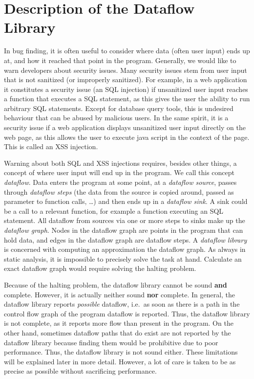 \section{Description of the Dataflow Library}
In bug finding, it is often useful to consider where data (often user input)
ends up at, and how it reached that point in the program.
Generally, we would like to warn developers about security issues.
Many security issues stem from user input that is not sanitized (or improperly sanitized).
For example, in a web application it constitutes a security issue (an SQL injection)
if unsanitized user input reaches a function that executes a SQL statement, 
as this gives the user 
the ability to run arbitrary SQL statements.
Except for database query tools, this is undesired behaviour that can be abused
by malicious users.
In the same spirit, it is a security issue if a web application displays
unsanitized user input directly on the web page, as this allows the user to execute
java script in the context of the page. This is called an XSS injection.

Warning about both SQL and XSS injections requires, besides other things,
a concept of where user input will end up in the program.
We call this concept \emph{dataflow}.
Data enters the program at some point, at a \emph{dataflow source}, passes through 
\emph{dataflow steps} (the data from the source is copied around, passed as parameter 
to function calls, \ldots) and then ends up in a \emph{dataflow sink}.
A sink could be a call to a relevant function, for example a function
executing an SQL statement.
All dataflow from sources via one or more steps to sinks make up the 
\emph{dataflow graph}.
Nodes in the dataflow graph are points in the program that can hold data, 
and edges in the dataflow graph are dataflow steps.
A \emph{dataflow library} is concerned with computing an approximation 
the dataflow graph.
As always in static analysis, it is impossible to precisely solve the task at hand.
Calculate an exact dataflow graph would require solving the halting problem.

Because of the halting problem, the dataflow library cannot be sound \textbf{and}
complete. However, it is actually neither sound \textbf{nor} complete.
In general, the dataflow library reports \emph{possible} dataflow, i.e.\ as soon
as there is a path in the control flow graph of the program dataflow is reported.
Thus, the dataflow library is not complete, as it reports more flow than present
in the program.
On the other hand, sometimes dataflow paths that do exist are not reported by the 
dataflow library because finding them would be prohibitive due to poor performance.
Thus, the dataflow library is not sound either.
These limitations will be explained later in more detail.
However, a lot of care is taken to be as precise as possible 
without sacrificing performance. 

